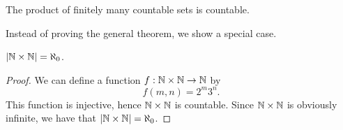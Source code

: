 



\begin{theorem}
  The product of finitely many countable sets is countable. 
\end{theorem}

Instead of proving the general theorem, we show a special case.
\begin{proposition}
$|\mathbb{N}\times \mathbb{N}|=\aleph_0$.
\end{proposition}
\begin{proof}
  We can define a function \(f:\mathbb{N}\times\mathbb{N}\to\mathbb{N}\) by
  \[
  f(m,n) = 2^m 3^n.
  \]
  This function is injective, hence $\mathbb{N}\times\mathbb{N}$ is countable. Since $\mathbb{N}\times \mathbb{N}$ is obviously infinite, we have that $|\mathbb{N}\times\mathbb{N}|=\aleph_0$. 
\end{proof}

\fi

\ifdefined\stopaftercountableproduct
  \expandafter\endinput
\fi

As a consequence, we have that taking countable unions still cannot increase cardinality.

\begin{theorem}
  Let $A_n$ be a countable set for each \(n\in\N\). Then $\bigcup_nA_n$ is countable.
\end{theorem}
\begin{proof}
  Since $A_n$ is countable, there is a surjection $f_n:\N\to A_n$. Define a function \(f:\N\times \N\to \bigcup_n A_n\) by
  \[
  f(m,n) = f_n(m).
  \]
  This function is surjective, hence \(\bigcup_n A_n\) is countable.
\end{proof}

How about the product of countably many countable sets?


